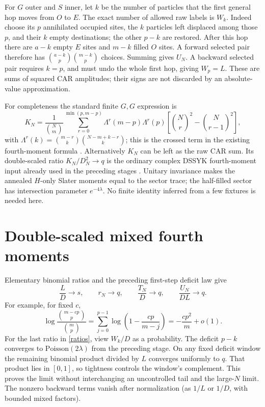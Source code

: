\documentclass[11pt]{article}
\newcommand{\bn}[2]{\binom{#1}{#2}}
\begin{document}
\newpage
For $G$ outer and $S$ inner, let $k$ be the number of particles
that the first general hop moves from $O$ to $E$. The exact number
of allowed raw labels is $W_k$. Indeed choose its $p$ annihilated
occupied sites, the $k$ particles left displaced among those $p$,
and their $k$ empty destinations; the other $p-k$ are restored.
After this hop there are $a-k$ empty $E$ sites and $m-k$ filled
$O$ sites. A forward selected pair therefore has
$\bn{a-k}p\bn{m-k}p$ choices. Summing gives $U_N$.
A backward selected pair requires $k=p$, and must undo the whole
first hop, giving $W_p=L$. These are sums of squared CAR amplitudes;
their signs are not discarded by an absolute-value approximation.

For completeness the standard finite $G,G$ expression is
\begin{equation}\label{K}
 K_N=\frac{1}{\bn Nm}\sum_{r=0}^{\min(p,m-p)}
 \Lambda^r(m-p)\Lambda^r(p)
 \left[\bn Nr^2-\bn N{r-1}^2\right],
\end{equation}
with $\Lambda^r(k)=\bn{m-r}k\bn{N-m+k-r}k$; this is the
crossed term in the existing fourth-moment formula
\cite[Eq.~(28)]{Kota}. Alternatively $K_N$ can be left as the
raw CAR sum. Its double-scaled ratio $K_N/D_N^2\to q$ is the
ordinary complex DSSYK fourth-moment input already used in the
preceding stages \cite[Sec.~5.1]{BNR}. Unitary invariance makes the
annealed $H$-only Slater moments equal to the sector trace; the
half-filled sector has intersection parameter $e^{-4\lambda}$.
No finite identity inferred from a few fixtures
is needed here.

\section{Double-scaled mixed fourth moments}
Elementary binomial ratios and the preceding first-step deficit
law give
\begin{equation}\label{ratios}
 \frac LD\to s,\qquad r_N\to q,\qquad
 \frac{T_N}{D}\to q,\qquad\frac{U_N}{DL}\to q.
\end{equation}
For example, for fixed $c$,
\begin{equation}
 \log\frac{\bn{m-cp}p}{\bn mp}
 =\sum_{j=0}^{p-1}\log\left(1-\frac{cp}{m-j}\right)
 =-\frac{cp^2}{m}+o(1).
\end{equation}
For the last ratio in \eqref{ratios}, view $W_k/D$ as a probability.
The deficit $p-k$ converges to $\mathrm{Poisson}(2\lambda)$ from
the preceding stage. On any fixed deficit window the remaining
binomial product divided by $L$ converges uniformly to $q$.
That product lies in $[0,1]$, so tightness controls the window's
complement. This proves the limit without interchanging an
uncontrolled tail and the large-$N$ limit.
The nonzero backward terms vanish after normalization (as $1/L$
or $1/D$, with bounded mixed factors).
\end{document}

